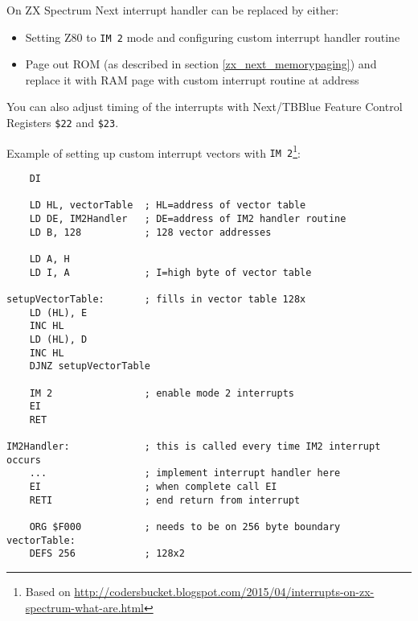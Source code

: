 On ZX Spectrum Next interrupt handler can be replaced by either:

\begin{itemize}
    \item Setting Z80 to {\tt IM 2} mode and configuring custom interrupt handler routine
	
    \item Page out ROM (as described in section \ref{zx_next_memorypaging}) and replace it with RAM page with custom interrupt routine at address 
\end{itemize}

You can also adjust timing of the interrupts with Next/TBBlue Feature Control Registers {\tt \$22} and {\tt \$23}.

\pagebreak
Example of setting up custom interrupt vectors with {\tt IM 2}\footnote{Based on \url{http://codersbucket.blogspot.com/2015/04/interrupts-on-zx-spectrum-what-are.html}}:

\begin{lstlisting}
    DI
	
    LD HL, vectorTable  ; HL=address of vector table
    LD DE, IM2Handler   ; DE=address of IM2 handler routine
    LD B, 128           ; 128 vector addresses

    LD A, H
    LD I, A             ; I=high byte of vector table

setupVectorTable:       ; fills in vector table 128x
    LD (HL), E
    INC HL
    LD (HL), D
    INC HL
    DJNZ setupVectorTable 

    IM 2                ; enable mode 2 interrupts
    EI
    RET

IM2Handler:             ; this is called every time IM2 interrupt occurs
    ...                 ; implement interrupt handler here
    EI                  ; when complete call EI
    RETI                ; end return from interrupt

    ORG $F000           ; needs to be on 256 byte boundary
vectorTable:
    DEFS 256            ; 128x2
\end{lstlisting}



\pagebreak
